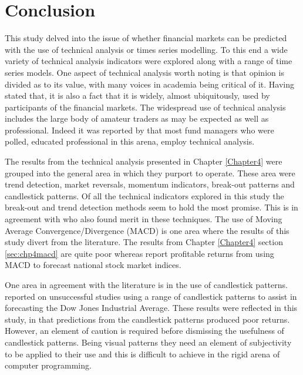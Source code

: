 \section{Conclusion}
This study delved into the issue of whether financial markets can be predicted with the use of technical analysis or times series modelling.  To this end a wide variety of technical analysis indicators were explored along with a range of time series models. One aspect of technical analysis worth noting is that opinion is divided as to its value, with many voices in academia being critical of it. Having stated that, it is also a fact that it is widely, almost ubiquitously, used by participants of the financial markets. The widespread use of technical analysis includes the large body of amateur traders as may be expected as well as professional. Indeed it was reported by \cite{Menkhoff20102573} that most fund managers who were polled, educated professional in this arena, employ technical analysis.

The results from the technical analysis presented in Chapter \ref{Chapter4} were grouped into the general area in which they purport to operate. These area were trend detection, market reversals, momentum indicators, break-out patterns and candlestick patterns. Of all the technical indicators explored in this study the break-out and trend detection methods seem to hold the most promise. This is in agreement with \cite{Brock} who also found merit in these techniques. The use of Moving Average Convergence/Divergence (MACD) is one area where the results of this study divert from the literature. The results from Chapter \ref{Chapter4} section \ref{sec:chp4macd} are quite poor whereas \cite{Prodan2013214} report profitable returns from using MACD to forecast national stock market indices.

One area in agreement with the literature is in the use of candlestick patterns. \citep{Marshall20062303} reported on unsuccessful studies using a range of candlestick patterns to assist in forecasting the Dow Jones Industrial Average. These results were reflected in this study, in that predictions from the candlestick patterns produced poor returns. However, an element of caution is required before dismissing the usefulness of candlestick patterns. Being visual patterns they need an element of subjectivity to be applied to their use and this is difficult to achieve in the rigid arena of computer programming. %

